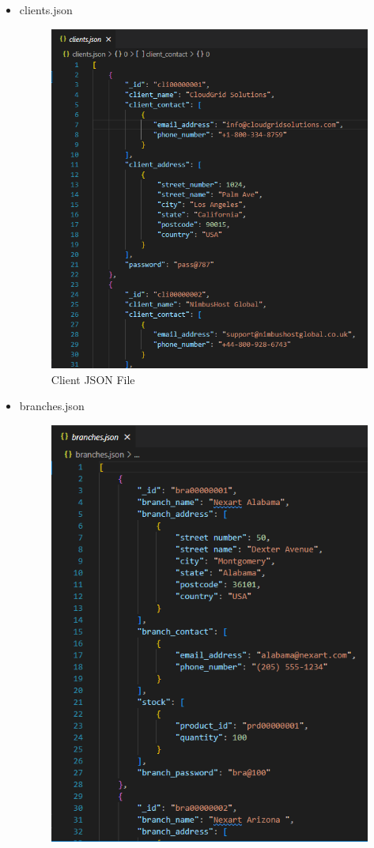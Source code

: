 \documentclass[a4Paper,12pt]{report}
\begin{document}
\begin{itemize}
\item clients.json
\begin{figure}[H]
\centering
\includegraphics[scale=0.4]{images/clients_json.png}
\caption{Client JSON File}
\end{figure}
\item branches.json
\begin{figure}[H]
\centering
\includegraphics[scale=0.4]{images/branches_json.png}

\end{figure}
\end{itemize}
\end{document}
